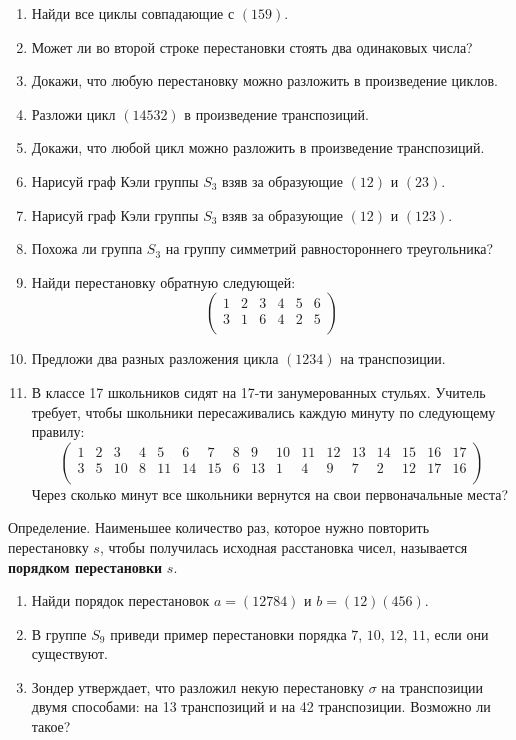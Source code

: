 \documentclass[12pt]{article} %
\begin{document}
\begin{enumerate}
\item Найди все циклы совпадающие с $(159)$.
\item Может ли во второй строке перестановки стоять два одинаковых числа?
\item Докажи, что любую перестановку можно разложить в произведение циклов.
\item Разложи цикл $(14532)$ в произведение транспозиций.
\item Докажи, что любой цикл можно разложить в произведение транспозиций.
\item Нарисуй граф Кэли группы $S_3$ взяв за образующие $(12)$ и $(23)$.
\item Нарисуй граф Кэли группы $S_3$ взяв за образующие $(12)$ и $(123)$.
\item Похожа ли группа $S_3$ на группу симметрий равностороннего треугольника?
\item Найди перестановку обратную следующей:
\[
    \begin{pmatrix}
        1& 2& 3& 4& 5& 6 \\
        3& 1& 6& 4& 2& 5 \\
    \end{pmatrix}
\]
\item Предложи два разных разложения цикла $(1234)$ на транспозиции.
\item В классе 17 школьников сидят на 17-ти занумерованных стульях. Учитель требует, чтобы школьники пересаживались каждую минуту по следующему правилу:
\setcounter{MaxMatrixCols}{20} %
\[
    \begin{pmatrix}
  1 & 2 & 3 & 4 & 5 & 6 & 7 & 8 & 9 & 10 & 11 & 12 & 13 & 14 & 15 & 16 & 17 \\
  3 & 5 &10 & 8 &11 & 14& 15& 6 & 13& 1  &  4 &  9 & 7  &  2 & 12 & 17 & 16 \\
  \end{pmatrix}
\]
Через сколько минут все школьники вернутся на свои первоначальные места?
\end{enumerate}

Определение. Наименьшее количество раз, которое нужно повторить перестановку $s$, чтобы получилась исходная расстановка чисел, называется \textbf{порядком перестановки} $s$.

\begin{enumerate}[resume]
\item Найди порядок перестановок $a=(12784)$ и $b=(12)(456)$.
\item В группе $S_{9}$ приведи пример перестановки порядка $7$, $10$, $12$, $11$, если они существуют.
\item Зондер утверждает, что разложил некую перестановку $\sigma$ на транспозиции двумя способами: на 13 транспозиций и на 42 транспозиции. Возможно ли такое?
\end{enumerate}
\end{document}
